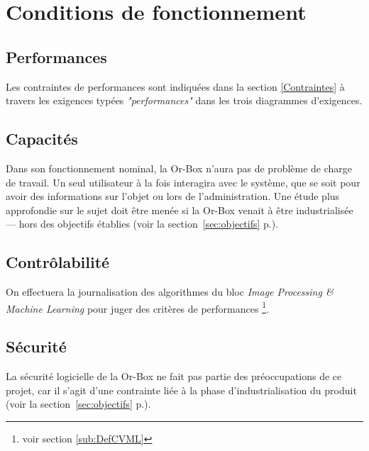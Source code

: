 \section{Conditions de fonctionnement}

	\subsection{Performances}
	
Les contraintes de performances sont indiquées dans la section \ref{Contraintes} à travers les exigences typées \emph{"performances"} dans les trois diagrammes d'exigences.

	\subsection{Capacités}
	
Dans son fonctionnement nominal, la Or-Box n'aura pas de problème de charge de travail.
Un seul utilisateur à la fois interagira avec le système, que se soit pour avoir des informations sur l'objet ou lors de l'administration. Une étude plus approfondie sur le sujet doit être menée si la Or-Box venait à être industrialisée --- hors des objectifs établies (voir la section~\ref{sec:objectifs} p.\pageref{sec:objectifs}).

    \subsection{Contrôlabilité}

On effectuera la journalisation des algorithmes du bloc \emph{Image Processing \& Machine Learning} pour juger des critères de performances \footnote{voir section \ref{sub:DefCVML}}.

    \subsection{Sécurité}

La sécurité logicielle de la Or-Box ne fait pas partie des préoccupations de ce projet, car il s'agit d'une contrainte liée à la phase d'industrialisation du produit (voir la section~\ref{sec:objectifs} p.\pageref{sec:objectifs}).